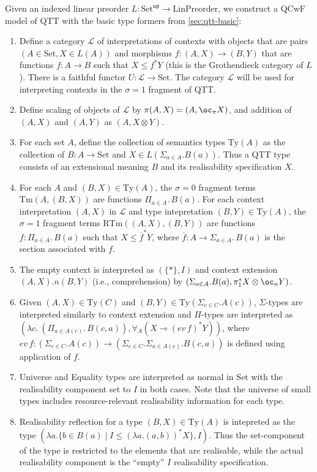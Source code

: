 \documentclass[acmsmall,screen]{acmart}
\newcommand{\Ty}{\mathrm{Ty}}
\newcommand{\RTm}{\mathrm{RTm}}
\newcommand{\Tm}{\mathrm{Tm}}
\newcommand{\Set}{\mathrm{Set}}
\newcommand{\cat}[1]{\mathcal{#1}}
\newcommand{\op}{\mathsf{op}}
\newcommand{\LinPreorder}{\mathrm{LinPreorder}}
\begin{document}
Given an indexed linear preorder $L : \Set^\op \to \LinPreorder$, we
construct a QCwF model of QTT with the basic type formers from
\autoref{sec:qtt-basic}:
\begin{enumerate}
\item Define a category $\cat{L}$ of interpretations of contexts with
  objects that are pairs $(A \in \Set, X \in L(A))$ and morphisms
  $f : (A,X) \to (B, Y)$ that are functions $f : A \to B$ such that
  $X \leq f^*Y$ (this is the Grothendieck category of $L$). There is a
  faithful functor $U : \cat{L} \to \Set$. The category $\cat{L}$ will
  be used for interpreting contexts in the $\sigma = 1$ fragment of
  QTT.
\item Define scaling of objects of $\cat{L}$ by
  $\pi(A,X) = (A, \oc_\pi X)$, and addition of $(A, X)$ and $(A, Y)$
  as $(A, X \otimes Y)$.
\item For each set $A$, define the collection of semantics types
  $\Ty(A)$ as the collection of $B : A \to \Set$ and
  $X \in L(\Sigma_{a \in A}.B(a))$. Thus a QTT type consists of an
  extensional meaning $B$ and its realisability specification $X$.
\item For each $A$ and $(B,X) \in \Ty(A)$, the $\sigma = 0$ fragment
  terms $\Tm(A,(B,X))$ are functions $\Pi_{a \in A}.\,B(a)$. For each
  context interpretation $(A, X)$ in $\cat{L}$ and type intepretation
  $(B,Y) \in \Ty(A)$, the $\sigma = 1$ fragment terms
  $\RTm((A,X),(B,Y))$ are functions $f : \Pi_{a \in A}.\,B(a)$ such
  that $X \leq \overline{f}^*Y$, where
  $\overline{f} : A \to \Sigma_{a \in A}.\,B(a)$ is the section
  associated with $f$.
\item The empty context is interpreted as $(\{*\}, I)$ and context
  extension $(A,X).n(B,Y)$ (i.e., comprehension) by
  $(\Sigma_{a \in A}.B(a), \pi_1^* X \otimes \oc_n Y)$.
\item Given $(A,X) \in \Ty(C)$ and
  $(B,Y) \in \Ty(\Sigma_{c \in C}.A(c))$, $\Sigma$-types are
  interpreted similarly to context extension and $\Pi$-types are
  interpreted as
  $(\lambda c.~(\Pi_{a \in A(c)}.\,B(c,a)), \forall_{A}(X \multimap
  (\mathit{ev}\,f)^*Y))$, where
  $\mathit{ev}\,f : (\Sigma_{c \in C}.A(c)) \to (\Sigma_{c \in
    C}.\Sigma_{a \in A(c)}.B(c,a))$ is defined using application of
  $f$.
\item Universe and Equality types are interpreted as normal in $\Set$
  with the realisability component set to $I$ in both cases. Note that
  the universe of small types includes resource-relevant realisability
  information for each type.
\item Realisability reflection for a type $(B,X) \in \Ty(A)$ is
  intepreted as the type
  $(\lambda a. \{ b \in B(a) \mid I \leq (\lambda a. (a,b))^*X \},
  I)$. Thus the set-component of the type is restricted to the
  elements that are realisable, while the actual realisability
  component is the ``empty'' $I$ realisability specification.
\end{enumerate}
\end{document}
